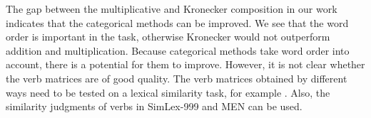 The gap between the multiplicative and Kronecker composition in our work indicates that the categorical methods can be improved. We see that the word order is important in the task, otherwise Kronecker would not outperform addition and multiplication. Because categorical methods take word order into account, there is a potential for them to improve. However, it is not clear whether the verb matrices are of good quality. The verb matrices obtained by different ways need to be tested on a lexical similarity task, for example . Also, the similarity judgments of verbs in SimLex-999 and MEN can be used.



